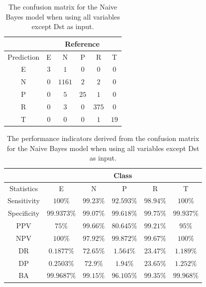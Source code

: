 \documentclass[sn-mathphys-num]{sn-jnl}%
\begin{document}
\begin{table}[!ht]
    \centering
    \caption{The confusion matrix for the Naive Bayes model when using all variables except Dst as input.}
	\label{tab:cm:no_DisturbanceStormTime:nb}
	\begin{tabular}{|c|c|c|c|c|c|}
		\hline
		 & \multicolumn{5}{|c|}{Reference} \\ \hline
		 Prediction & E & N & P & R & T \\ \hline
		 E & $3$ & $1$ & $0$ & $0$ & $0$ \\ \hline
		 N & $0$ & $1161$ & $2$ & $2$ & $0$ \\ \hline
		 P & $0$ & $5$ & $25$ & $1$ & $0$ \\ \hline
		 R & $0$ & $3$ & $0$ & $375$ & $0$ \\ \hline
		 T & $0$ & $0$ & $0$ & $1$ & $19$ \\ \hline
	\end{tabular}
\end{table}

\begin{table}[!ht]
    \centering
    \caption{The performance indicators derived from the confusion matrix for the Naive Bayes model when using all variables except Dst as input.}
	\label{tab:cs:reverse:no_DisturbanceStormTime:nb}
	\begin{tabular}{|c|c|c|c|c|c|}
		\hline
		 & \multicolumn{5}{c|}{Class} \\ \hline
		Statistics & E & N & P & R & T \\ \hline
		Sensitivity & $100\%$ & $99.23\%$ & $92.593\%$ & $98.94\%$ & $100\%$ \\ \hline
		Specificity & $99.9373\%$ & $99.07\%$ & $99.618\%$ & $99.75\%$ & $99.937\%$ \\ \hline
		PPV & $75\%$ & $99.66\%$ & $80.645\%$ & $99.21\%$ & $95\%$ \\ \hline
		NPV & $100\%$ & $97.92\%$ & $99.872\%$ & $99.67\%$ & $100\%$ \\ \hline
		DR & $0.1877\%$ & $72.65\%$ & $1.564\%$ & $23.47\%$ & $1.189\%$ \\ \hline
		DP & $0.2503\%$ & $72.9\%$ & $1.94\%$ & $23.65\%$ & $1.252\%$ \\ \hline
		BA & $99.9687\%$ & $99.15\%$ & $96.105\%$ & $99.35\%$ & $99.968\%$ \\ \hline
	\end{tabular}
\end{table}
\end{document}
